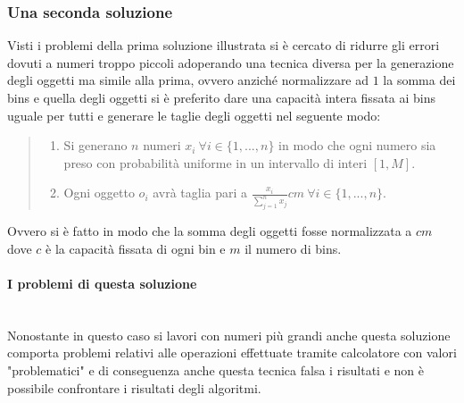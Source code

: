 \subsubsection{Una seconda soluzione}
Visti i problemi della prima soluzione illustrata si è cercato di ridurre gli errori dovuti a numeri troppo piccoli adoperando
una tecnica diversa per la generazione degli oggetti ma simile alla prima, ovvero anziché normalizzare ad $ 1 $ la somma dei bins 
e quella degli oggetti si è preferito dare una capacità intera fissata ai bins uguale per tutti e generare le taglie degli oggetti nel
seguente modo:
\begin{quote}
	\begin{enumerate}
		\item Si generano $ n $ numeri $ x_i \: \forall i \in \{1, ..., n\} $ in modo che ogni numero sia preso con probabilità 
			  uniforme in un intervallo di interi $ [1, M] $.
		\item Ogni oggetto $ o_i $ avrà taglia pari a $ \displaystyle\frac{x_i}{\sum_{j=1}^n x_j}cm \: \forall i \in \{1, ..., n\} $. 
	\end{enumerate}
\end{quote}
Ovvero si è fatto in modo che la somma degli oggetti fosse normalizzata a $ cm $ dove $ c $ è la capacità fissata
di ogni bin e $ m $ il numero di bins.

\paragraph{I problemi di questa soluzione}\mbox{}\\
Nonostante in questo caso si lavori con numeri più grandi anche questa soluzione comporta problemi relativi
alle operazioni effettuate tramite calcolatore con valori "problematici" e di conseguenza anche questa tecnica falsa i risultati e non è possibile confrontare
i risultati degli algoritmi.


